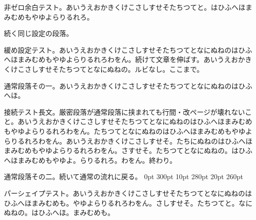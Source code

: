 \documentclass[pdflatex]{jlreq}
\begin{document}
\begingroup
\parskip=5pt
\rightskip=10pt
\begin{jlreqparagraph}
非ゼロ余白テスト。あいうえおかきくけこさしすせそたちつてと。はひふへほまみむめもやゆよらりるれろ。
\end{jlreqparagraph}
続く同じ設定の段落。
\endgroup
\begingroup
\begin{jlreqparagraph}
緩め設定テスト。あいうえおかきくけこさしすせそたちつてとなにぬねのはひふへほまみむめもやゆよらりるれろわをん。続けて文章を伸ばす。あいうえおかきくけこさしすせそたちつてとなにぬねの。ルビなし。ここまで。
\end{jlreqparagraph}
\endgroup
通常段落その一。あいうえおかきくけこさしすせそたちつてとなにぬねのはひふへほ。
\begin{jlreqparagraph}
接続テスト長文。厳密段落が通常段落に挟まれても行間・改ページが壊れないこと。あいうえおかきくけこさしすせそたちつてとなにぬねのはひふへほまみむめもやゆよらりるれろわをん。たちつてとなにぬねのはひふへほまみむめもやゆよらりるれろわをん。あいうえおかきくけこさしすせそ。たちにぬねのはひふへほまみむめもやゆよらりるれろわをん。さすせそ。たちつてとなにぬねの。はひふへほまみむめもやゆよ。らりるれろ。わをん。終わり。
\end{jlreqparagraph}
通常段落その二。続いて通常の流れに戻る。
\begingroup
{} 0pt 300pt 10pt 280pt 20pt 260pt
\begin{jlreqparagraph}
パーシェイプテスト。あいうえおかきくけこさしすせそたちつてとなにぬねのはひふへほまみむめも。やゆよらりるれろわをん。さしすせそ。たちつてと。なにぬねの。はひふへほ。まみむめも。
\end{jlreqparagraph}
\endgroup
\makeatletter
{}
\makeatother
\end{document}
